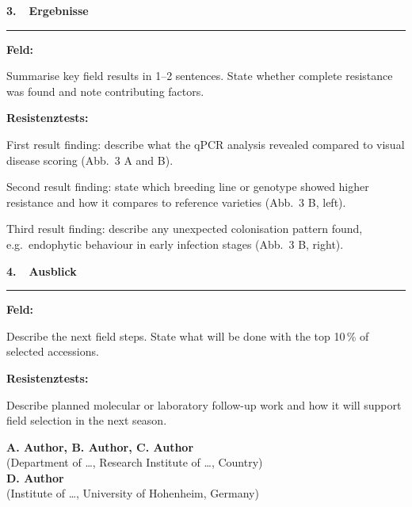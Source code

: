 \documentclass[final]{beamer}
\newcommand{\postersection}[1]{%
  \vspace{4mm}%
  {\color{HohenheimGreen}\bfseries\large #1}\\[-1mm]%
  {\color{HohenheimGreen}\rule{\linewidth}{1.5pt}}%
  \vspace{2mm}%
}
\newcommand{\postersubsec}[1]{%
  \smallskip%
  {\bfseries #1}%
  \smallskip%
}
\newlength{\colsep}       \setlength{\colsep}{10mm}
\newlength{\leftcolwidth}
\newlength{\rightcolwidth}
\begin{document}
\begin{frame}[t]{}
\begin{minipage}[t]{\leftcolwidth}
  \vspace{8mm}

  \postersection{3.~~Ergebnisse}

  \postersubsec{Feld:}

  Summarise key field results in 1–2 sentences. State whether complete
  resistance was found and note contributing factors.

  \vspace{4mm}
  \postersubsec{Resistenztests:}

  First result finding: describe what the qPCR analysis revealed compared
  to visual disease scoring (Abb.~3 A and B).

  \vspace{3mm}
  Second result finding: state which breeding line or genotype showed higher
  resistance and how it compares to reference varieties (Abb.~3 B, left).

  \vspace{3mm}
  Third result finding: describe any unexpected colonisation pattern found,
  e.g.\ endophytic behaviour in early infection stages (Abb.~3 B, right).

  \vspace{8mm}

  \postersection{4.~~Ausblick}

  \postersubsec{Feld:}

  Describe the next field steps. State what will be done with the top
  10\,\% of selected accessions.

  \vspace{4mm}
  \postersubsec{Resistenztests:}

  Describe planned molecular or laboratory follow-up work and how it will
  support field selection in the next season.

  \vspace{10mm}

  {\small
    \textbf{A. Author, B. Author, C. Author}\\
    (Department of …, Research Institute of …, Country)\\[2mm]
    \textbf{D. Author}\\
    (Institute of …, University of Hohenheim, Germany)%
  }

\end{minipage}%
\hspace{\colsep}%
%
\begin{minipage}[t]{\rightcolwidth}


\end{minipage}
\end{frame}
\end{document}
